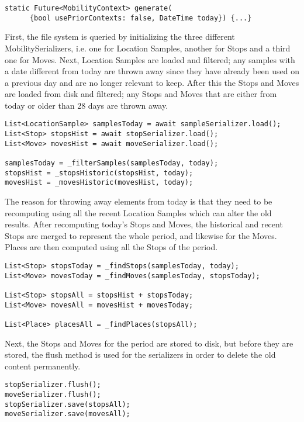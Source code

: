 \begin{verbatim}
static Future<MobilityContext> generate(
      {bool usePriorContexts: false, DateTime today}) {...}
\end{verbatim}

First, the file system is queried by initializing the three different MobilitySerializers, i.e. one for Location Samples, another for Stops and a third one for Moves. Next, Location Samples are loaded and filtered; any samples with a date different from today are thrown away since they have already been used on a previous day and are no longer relevant to keep. After this the Stops and Moves are loaded from disk and filtered; any Stops and Moves that are either from today or older than 28 days are thrown away.

\begin{verbatim}
List<LocationSample> samplesToday = await sampleSerializer.load();
List<Stop> stopsHist = await stopSerializer.load();
List<Move> movesHist = await moveSerializer.load();

samplesToday = _filterSamples(samplesToday, today);
stopsHist = _stopsHistoric(stopsHist, today);
movesHist = _movesHistoric(movesHist, today);
\end{verbatim}

The reason for throwing away elements from today is that they need to be recomputing using all the recent Location Samples which can alter the old results. After recomputing today's Stops and Moves, the historical and recent Stops are merged to represent the whole period, and likewise for the Moves. Places are then computed using all the Stops of the period.

\begin{verbatim}
List<Stop> stopsToday = _findStops(samplesToday, today);
List<Move> movesToday = _findMoves(samplesToday, stopsToday);

List<Stop> stopsAll = stopsHist + stopsToday;
List<Move> movesAll = movesHist + movesToday;

List<Place> placesAll = _findPlaces(stopsAll);
\end{verbatim}

Next, the Stops and Moves for the period are stored to disk, but before they are stored, the flush method is used for the serializers in order to delete the old content permanently.
\begin{verbatim}
stopSerializer.flush();
moveSerializer.flush();
stopSerializer.save(stopsAll);
moveSerializer.save(movesAll);
\end{verbatim}

